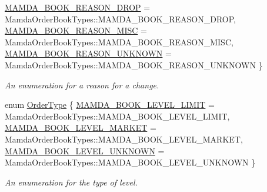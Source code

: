 \begin{CompactItemize}
\par
\hyperlink{classWombat_1_1MamdaOrderBookPriceLevel_cef40c91570e45ff2313cfe91c42910fca1ee337f9ae5f55673994055403c64e}{MAMDA\_\-BOOK\_\-REASON\_\-DROP} =  Mamda\-Order\-Book\-Types::MAMDA\_\-BOOK\_\-REASON\_\-DROP, 
\hyperlink{classWombat_1_1MamdaOrderBookPriceLevel_cef40c91570e45ff2313cfe91c42910f6899575e9eedc8fa1387e74ba5f8c8f1}{MAMDA\_\-BOOK\_\-REASON\_\-MISC} =  Mamda\-Order\-Book\-Types::MAMDA\_\-BOOK\_\-REASON\_\-MISC, 
\hyperlink{classWombat_1_1MamdaOrderBookPriceLevel_cef40c91570e45ff2313cfe91c42910fe31cc6ee5c713c2cebafd95e72c800ac}{MAMDA\_\-BOOK\_\-REASON\_\-UNKNOWN} =  Mamda\-Order\-Book\-Types::MAMDA\_\-BOOK\_\-REASON\_\-UNKNOWN
 \}
\begin{CompactList}\small\item\em An enumeration for a reason for a change. \item\end{CompactList}\item 
enum \hyperlink{classWombat_1_1MamdaOrderBookPriceLevel_7c24238cb240e1d2d86aaa414198c996}{Order\-Type} \{ \hyperlink{classWombat_1_1MamdaOrderBookPriceLevel_7c24238cb240e1d2d86aaa414198c9968cf3347881521358e8769c0c984fb5b2}{MAMDA\_\-BOOK\_\-LEVEL\_\-LIMIT} =  Mamda\-Order\-Book\-Types::MAMDA\_\-BOOK\_\-LEVEL\_\-LIMIT, 
\hyperlink{classWombat_1_1MamdaOrderBookPriceLevel_7c24238cb240e1d2d86aaa414198c9966ac370d137039f0bd50f9c3f097452fc}{MAMDA\_\-BOOK\_\-LEVEL\_\-MARKET} =  Mamda\-Order\-Book\-Types::MAMDA\_\-BOOK\_\-LEVEL\_\-MARKET, 
\hyperlink{classWombat_1_1MamdaOrderBookPriceLevel_7c24238cb240e1d2d86aaa414198c9963c7c9b25ae8c324f9918d4e6defecffc}{MAMDA\_\-BOOK\_\-LEVEL\_\-UNKNOWN} =  Mamda\-Order\-Book\-Types::MAMDA\_\-BOOK\_\-LEVEL\_\-UNKNOWN
 \}
\begin{CompactList}\small\item\em An enumeration for the type of level. \item\end{CompactList}\end{CompactItemize}
